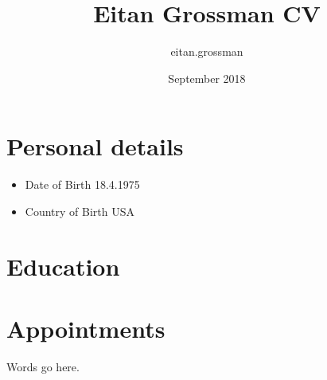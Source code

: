 \documentclass{article}
\title{Eitan Grossman CV}
\author{eitan.grossman }
\date{September 2018}
\begin{document}
\maketitle

\section{Personal details}
\begin{itemize}
    \item Date of Birth 		18.4.1975
    \item Country of Birth	    USA
    
\cite{ALH2014}

\end{itemize}

\section{Education}
\section{Appointments}


Words go here.
\cite{LV2015}
\end{document}
